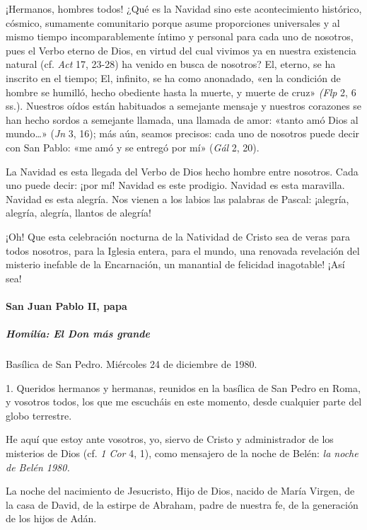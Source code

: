 \documentclass[]{article}
\let\oldparagraph\paragraph
\renewcommand{\paragraph}[1]{\oldparagraph{#1}\mbox{}}
\let\oldsubparagraph\subparagraph
\renewcommand{\subparagraph}[1]{\oldsubparagraph{#1}\mbox{}}
\begin{document}
¡Hermanos, hombres todos! ¿Qué es la Navidad sino este acontecimiento
histórico, cósmico, sumamente comunitario porque asume proporciones
universales y al mismo tiempo incomparablemente íntimo y personal para
cada uno de nosotros, pues el Verbo eterno de Dios, en virtud del cual
vivimos ya en nuestra existencia natural (cf. \emph{Act} 17, 23-28) ha
venido en busca de nosotros? El, eterno, se ha inscrito en el tiempo;
El, infinito, se ha como anonadado, «en la condición de hombre se
humilló, hecho obediente hasta la muerte, y muerte de cruz» \emph{(Flp}
2, 6 ss.). Nuestros oídos están habituados a semejante mensaje y
nuestros corazones se han hecho sordos a semejante llamada, una llamada
de amor: «tanto amó Dios al mundo\ldots{}» (\emph{Jn} 3, 16); más aún,
seamos precisos: cada uno de nosotros puede decir con San Pablo: «me amó
y se entregó por mí» (\emph{Gál} 2, 20).

La Navidad es esta llegada del Verbo de Dios hecho hombre entre
nosotros. Cada uno puede decir: ¡por mí! Navidad es este prodigio.
Navidad es esta maravilla. Navidad es esta alegría. Nos vienen a los
labios las palabras de Pascal: ¡alegría, alegría, alegría, llantos de
alegría!

¡Oh! Que esta celebración nocturna de la Natividad de Cristo sea de
veras para todos nosotros, para la Iglesia entera, para el mundo, una
renovada revelación del misterio inefable de la Encarnación, un
manantial de felicidad inagotable! ¡Así sea!

\paragraph{San Juan Pablo II, papa}\label{san-juan-pablo-ii-papa-5}

\subparagraph{Homilía: El Don más
grande}\label{homiluxeda-el-don-muxe1s-grande}

Basílica de San Pedro. Miércoles 24 de diciembre de 1980.

1. Queridos hermanos y hermanas, reunidos en la basílica de San Pedro en
Roma, y vosotros todos, los que me escucháis en este momento, desde
cualquier parte del globo terrestre.

He aquí que estoy ante vosotros, yo, siervo de Cristo y administrador de
los misterios de Dios (cf. \emph{1 Cor} 4, 1), como mensajero de la
noche de Belén: \emph{la noche de Belén 1980.}

La noche del nacimiento de Jesucristo, Hijo de Dios, nacido de María
Virgen, de la casa de David, de la estirpe de Abraham, padre de nuestra
fe, de la generación de los hijos de Adán.
\end{document}
